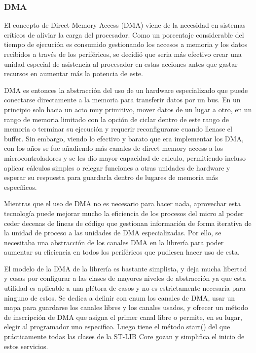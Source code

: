\documentclass{report}
\begin{document}
\subsubsection{DMA}
El concepto de Direct Memory Access (DMA) viene de la necesidad en sistemas críticos de aliviar la carga del procesador. Como un porcentaje considerable del tiempo de ejecución es consumido gestionando los accesos a memoria y los datos recibidos a través de los periféricos, se decidió que seria más efectivo crear una unidad especial de asistencia al procesador en estas acciones antes que gastar recursos en aumentar más la potencia de este. \par \vspace{0.3 cm}
DMA es entonces la abstracción del uso de un hardware especializado que puede conectarse directamente a la memoria para transferir datos por un bus. En un principio solo hacia un acto muy primitivo, mover datos de un lugar a otro, en un rango de memoria limitado con la opción de ciclar dentro de este rango de memoria o terminar su ejecución y requerir reconfigurarse cuando llenase el buffer. Sin embargo, viendo lo efectivo y barato que era implementar los DMA, con los años se fue añadiendo más canales de direct memory access a los microcontroladores y se les dio mayor capacidad de calculo, permitiendo incluso aplicar cálculos simples o relegar funciones a otras unidades de hardware y esperar su respuesta para guardarla dentro de lugares de memoria más específicos. 
\par \vspace{0.3 cm}
Mientras que el uso de DMA no es necesario para hacer nada, aprovechar esta tecnología puede mejorar mucho la eficiencia de los procesos del micro al poder ceder decenas de lineas de código que gestionan información de forma iterativa de la unidad de proceso a las unidades de DMA especializadas. Por ello, se necesitaba una abstracción de los canales DMA en la librería para poder aumentar su eficiencia en todos los periféricos que pudiesen hacer uso de esta. \par \vspace{0.3 cm}
El modelo de la DMA de la librería es bastante simplista, y deja mucha libertad y cosas por configurar a las clases de mayores niveles de abstracción ya que esta utilidad es aplicable a una plétora de casos y no es estrictamente necesaria para ninguno de estos. Se dedica a definir con enum los canales de DMA, usar un mapa para guardarse los canales libres y los canales usados, y ofrecer un método de inscripción de DMA que asigna el primer canal libre o permite, en su lugar, elegir al programador uno especifico. Luego tiene el método start() del que prácticamente todas las clases de la ST-LIB Core gozan y simplifica el inicio de estos servicios. 
\end{document}
